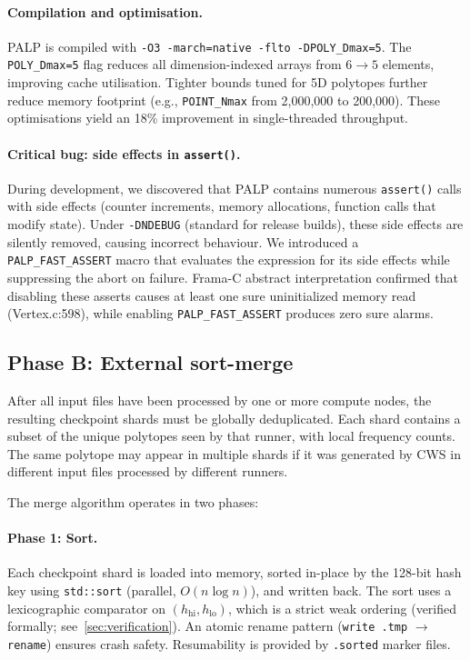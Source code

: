 \documentclass[12pt,a4paper]{article}
\theoremstyle{definition}
\begin{document}
\paragraph{Compilation and optimisation.}
PALP is compiled with \texttt{-O3 -march=native -flto -DPOLY\_Dmax=5}.
The \texttt{POLY\_Dmax=5} flag reduces all dimension-indexed arrays from
$6 \to 5$ elements, improving cache utilisation.  Tighter bounds tuned
for 5D polytopes further reduce memory footprint (e.g.,
\texttt{POINT\_Nmax} from 2,000,000 to 200,000).  These optimisations
yield an 18\% improvement in single-threaded throughput.

\paragraph{Critical bug: side effects in \texttt{assert()}.}
During development, we discovered that PALP contains numerous
\texttt{assert()} calls with side effects (counter increments, memory
allocations, function calls that modify state).  Under \texttt{-DNDEBUG}
(standard for release builds), these side effects are silently removed,
causing incorrect behaviour.  We introduced a \texttt{PALP\_FAST\_ASSERT}
macro that evaluates the expression for its side effects while
suppressing the abort on failure.  Frama-C abstract interpretation
confirmed that disabling these asserts causes at least one sure
uninitialized memory read (Vertex.c:598), while enabling
\texttt{PALP\_FAST\_ASSERT} produces zero sure alarms.

\subsection{Phase B: External sort-merge}
\label{sec:merge}

After all input files have been processed by one or more compute nodes,
the resulting checkpoint shards must be globally deduplicated.  Each shard
contains a subset of the unique polytopes seen by that runner, with
local frequency counts.  The same polytope may appear in multiple shards
if it was generated by CWS in different input files processed by
different runners.

The merge algorithm operates in two phases:

\paragraph{Phase 1: Sort.}
Each checkpoint shard is loaded into memory, sorted in-place by the
128-bit hash key using \texttt{std::sort} (parallel, $O(n \log n)$), and
written back.  The sort uses a lexicographic comparator on $(h_{\mathrm{hi}},
h_{\mathrm{lo}})$, which is a strict weak ordering (verified formally;
see~\cref{sec:verification}).  An atomic rename pattern
(\texttt{write .tmp} $\to$ \texttt{rename}) ensures crash safety.
Resumability is provided by \texttt{.sorted} marker files.
\end{document}
